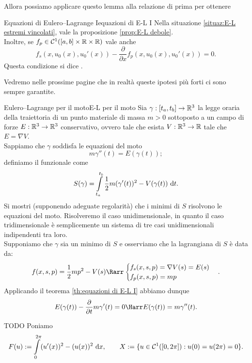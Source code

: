 \documentclass[openany]{book}
\begin{document}
Allora possiamo applicare questo lemma alla relazione di prima per ottenere

\begin{theorem}{Equazioni di Eulero--Lagrange I}{equazioni di E-L I}
    Nella situazione \ref{situaz:E-L estremi vincolati}, vale la proposizione \ref{prop:E-L debole}.\\
    Inoltre, se $f_p \in \mathcal{C}^1([a,b]\times \mathbb{R}\times \mathbb{R})$ vale anche
    \[ f_s(x,u_0(x),u_0'(x)) - \frac{\partial}{\partial x} f_p(x, u_0(x), u_0'(x)) = 0.\]
    Questa condizione si dice .
\end{theorem}

Vedremo nelle prossime pagine che in realtà queste ipotesi più forti ci sono sempre garantite.

\begin{exercise}{Eulero--Lagrange per il moto}{E-L per il moto}
    Sia $\gamma : [t_a,t_b]\to \mathbb{R}^3$ la legge oraria della traiettoria di un punto materiale di massa $m>0$ sottoposto a un campo di forze $E : \mathbb{R}^3 \to \mathbb{R}^3$ conservativo, ovvero tale che esista $V : \mathbb{R}^3\to \mathbb{R}$ tale che $E = \nabla V$.\\ Sappiamo che $\gamma$ soddisfa le equazioni del moto
    \[ m \gamma''(t) = E(\gamma(t)); \]
    definiamo il funzionale  come
    \[S(\gamma) = \intop_{t_a}^{t_b} \frac{1}{2} m (\gamma'(t))^2 - V(\gamma(t)) \de t .\]
    Si mostri (supponendo adeguate regolarità) che i minimi di $S$ risolvono le equazioni del moto.
    \solution 
    Risolveremo il caso unidimensionale, in quanto il caso tridimensionale è semplicemente un sistema di tre casi unidimensionali indipendenti tra loro.\\
    Supponiamo che $\gamma$ sia un minimo di $S$ e osserviamo che la lagrangiana di $S$ è data da:
    \[ f(x,s,p) = \frac{1}{2}m p^2 - V(s) \Rarr\begin{cases} f_s(x,s,p) = \nabla V(s) = E(s) \\ f_p(x,s,p)= m p\end{cases}. \]
    Applicando il teorema \ref{th:equazioni di E-L I} abbiamo dunque 
    \[ E(\gamma(t)) - \frac{\partial}{\partial t} m \gamma'(t) = 0 \Harr E(\gamma(t)) = m \gamma''(t). \]
    \solved
\end{exercise}

\begin{example}{TODO}{}
    Poniamo
    \[ F(u) := \intop_0^{2\pi} (u'(x))^2 - (u(x))^2 \de x, \qquad X := \{ u \in \mc{C}^1([0,2\pi]) : u(0)=u(2\pi)=0 \}. \]
\end{example}
\end{document}
